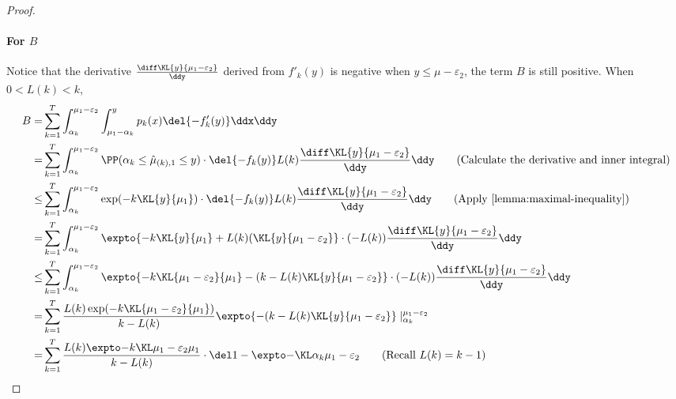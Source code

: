 \begin{proof}
    \paragraph{For $B$}
    Notice that the derivative $\frac{\diff \KL{y}{\mu_1-\varepsilon_2}}{\ddy}$ derived from $f'_k(y)$ is negative when $y \leq \mu-\varepsilon_2$, the term $B$ is still positive.
    When $0 < L(k) < k$,
    \begin{align}
        B
        =& 
            \sum_{k=1}^{T}
            \int_{\alpha_k}^{\mu_1 - \varepsilon_2}\int^{y}_{\mu_1 - \alpha_k} 
            p_k(x) \del{-f_k'(y)} \ddx \ddy
                \nonumber
        \\
        =&  
            \sum_{k=1}^{T}
            \int_{\alpha_k}^{\mu_1 - \varepsilon_2}
            \PP(\alpha_k \leq \hmu_{(k), 1} \leq y) \cdot
            \del{-f_k(y)} L(k) \frac{\diff \KL{y}{\mu_1 - \varepsilon_2}}{\ddy}
            \ddy
                \tag{Calculate the derivative and inner integral}
        \\
        \leq&
            \sum_{k=1}^{T}
            \int_{\alpha_k}^{\mu_1 - \varepsilon_2}
            \exp(-k \KL{y}{\mu_1}) \cdot
            \del{-f_k(y)} L(k) \frac{\diff \KL{y}{\mu_1 - \varepsilon_2}}{\ddy} 
            \ddy
                \tag{Apply \Cref{lemma:maximal-inequality}}
        \\
        =&
            \sum_{k=1}^{T}
            \int_{\alpha_k}^{\mu_1 - \varepsilon_2}
                \expto{
                    -k \KL{y}{\mu_1}
                    +L(k)(\KL{y}{\mu_1 - \varepsilon_2}
                    } \cdot 
                (-L(k)) \frac{\diff \KL{y}{\mu_1 - \varepsilon_2}}{\ddy} \ddy
                \nonumber
        \\
        \leq& 
            \sum_{k=1}^{T}
            \int_{\alpha_k}^{\mu_1 - \varepsilon_2}
                \expto{
                    -k \KL{\mu_1-\varepsilon_2}{\mu_1}
                -(k - L(k) \KL{y}{\mu_1-\varepsilon_2}
                    } \cdot 
                (-L(k)) \frac{\diff \KL{y}{\mu_1 - \varepsilon_2}}{\ddy} \ddy
                \nonumber
        \\
        =&
            \sum_{k=1}^{T}
            \frac{L(k)\exp(-k \KL{\mu_1-\varepsilon_2}{\mu_1})}{k-L(k)}
                \expto{
                -(k - L(k) \KL{y}{\mu_1-\varepsilon_2}
                    } \mid_{\alpha_k}^{\mu_1 - \varepsilon_2}
                \nonumber
        \\
        =&
            \ExpFThreeOneB
                \tag{Recall $L(k) = k-1$}

\end{align}
\end{proof}
